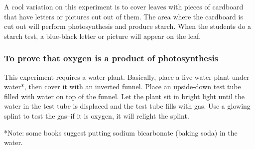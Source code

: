 A cool variation on this experiment is to cover leaves with pieces of cardboard that have letters or pictures cut out of them. The area where the cardboard is cut out will perform photosynthesis and produce starch. When the students do a starch test, a blue-black letter or picture will appear on the leaf.

\subsubsection{To prove that oxygen is a product of photosynthesis}
This experiment requires a water plant. Basically, place a live water plant under water*, then cover it with an inverted funnel. Place an upside-down test tube filled with water on top of the funnel. Let the plant sit in bright light until the water in the test tube is displaced and the test tube fills with gas. Use a glowing splint to test the gas--if it is oxygen, it will relight the splint.

*Note: some books suggest putting sodium bicarbonate (baking soda) in the water.
